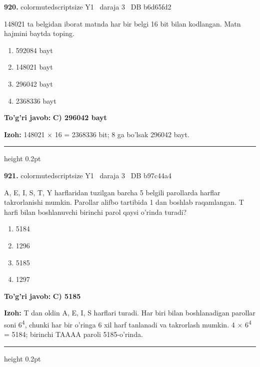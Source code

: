 \documentclass[10pt,a4paper,oneside]{article}
\begin{document}
\noindent\textbf{\color{ink}920.}  {color{muted}scriptsize Y1 \textbullet\ daraja 3 \textbullet\ DB b6d65fd2}
\par
148021 ta belgidan iborat matnda har bir belgi 16 bit bilan kodlangan. Matn hajmini baytda toping.
\begin{enumerate}[label=\Alph*),leftmargin=9mm]
\item 592084 bayt
\item 148021 bayt
\item 296042 bayt
\item 2368336 bayt
\end{enumerate}
\begin{tcolorbox}[enhanced,breakable,colback=teal!4,colframe=teal!50!black,boxrule=0.5pt,arc=1.1mm,left=3mm,right=3mm,top=1.7mm,bottom=1.7mm,before skip=2mm,after skip=2mm]
\textbf{\color{teal}To'g'ri javob:} \textbf{C) 296042 bayt}
\par\smallskip
\textbf{Izoh:} 148021 \ensuremath{\times} 16 = 2368336 bit; 8 ga bo'lsak 296042 bayt.
\end{tcolorbox}
\vspace{2mm}\hrule height 0.2pt \vspace{3mm}

\noindent\textbf{\color{ink}921.}  {color{muted}scriptsize Y1 \textbullet\ daraja 3 \textbullet\ DB b97c44a4}
\par
A, E, I, S, T, Y harflaridan tuzilgan barcha 5 belgili parollarda harflar takrorlanishi mumkin. Parollar alifbo tartibida 1 dan boshlab raqamlangan. T harfi bilan boshlanuvchi birinchi parol qaysi o'rinda turadi?
\begin{enumerate}[label=\Alph*),leftmargin=9mm]
\item 5184
\item 1296
\item 5185
\item 1297
\end{enumerate}
\begin{tcolorbox}[enhanced,breakable,colback=teal!4,colframe=teal!50!black,boxrule=0.5pt,arc=1.1mm,left=3mm,right=3mm,top=1.7mm,bottom=1.7mm,before skip=2mm,after skip=2mm]
\textbf{\color{teal}To'g'ri javob:} \textbf{C) 5185}
\par\smallskip
\textbf{Izoh:} T dan oldin A, E, I, S harflari turadi. Har biri bilan boshlanadigan parollar soni 6\textsuperscript{4}, chunki har bir o'ringa 6 xil harf tanlanadi va takrorlash mumkin. 4 \ensuremath{\times} 6\textsuperscript{4} = 5184; birinchi TAAAA paroli 5185-o'rinda.
\end{tcolorbox}
\vspace{2mm}\hrule height 0.2pt \vspace{3mm}
\end{document}
